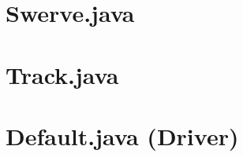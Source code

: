 \documentclass[letterpaper,10pt]{memoir}
\newcommand{\filelister}[1]{%
		
	}
\begin{document}
	\newpage\section*{Swerve.java}
	\filelister{Hardware/Swerve.java}

	\newpage\section*{Track.java}
	\filelister{Hardware/Track.java}

	
	\newpage\section*{Default.java (Driver)}
	\filelister{Driver/Default.java}



% 
% 
% 
\end{document}
